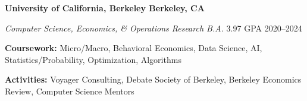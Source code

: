 \textbf{University of California, Berkeley \hfill Berkeley, CA} \par
\textit{Computer Science, Economics, \& Operations Research B.A.} 3.97 GPA \hfill 2020--2024\par
\textbf{Coursework:} Micro/Macro, Behavioral Economics, Data Science, AI, Statistics/Probability, Optimization, Algorithms\par
\textbf{Activities:} Voyager Consulting, Debate Society of Berkeley, Berkeley Economics Review, Computer Science Mentors